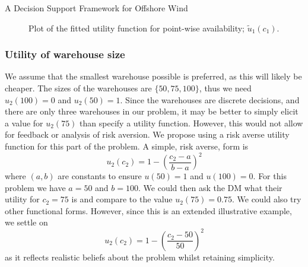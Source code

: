 \begin{chapter}{A Decision Support Framework for Offshore Wind \label{Ch:ds-for-ow}}
\begin{figure}
 \caption{Plot of the fitted utility function for point-wise availability; $\tilde{u}_1(c_1)$.\label{Fig:u1-c1}}
\end{figure}
\subsubsection{Utility of warehouse size}
We assume that the smallest warehouse possible is preferred, as this will likely be cheaper. The sizes of the warehouses are $\{50, 75, 100\}$, thus we need $u_2(100) = 0$ and $u_2(50) = 1$. Since the warehouses are discrete decisions, and there are only three warehouses in our problem, it may be better to simply elicit a value for $u_2(75)$ than specify a utility function. However, this would not allow for feedback or analysis of risk aversion. We propose using a risk averse utility function for this part of the problem. A simple, risk averse, form is
\begin{equation}
 u_2(c_2) = 1 - \left(\frac{c_2 - a}{b - a}\right)^2
\end{equation}
where $(a, b)$ are constants to ensure $u(50) = 1$ and $u(100) = 0$. For this problem we have $a = 50$ and $b = 100$. We could then ask the DM what their utility for $c_2 = 75$ is and compare to the value $u_2(75) = 0.75$. We could also try other functional forms. However, since this is an extended illustrative example, we settle on
\begin{equation}
 u_2(c_2) = 1 - \left(\frac{c_2 - 50}{50}\right)^2
\end{equation}
as it reflects realistic beliefs about the problem whilst retaining simplicity.

\end{chapter}
